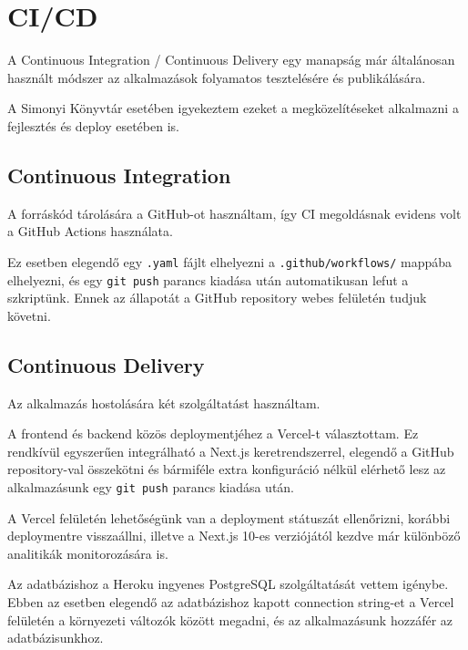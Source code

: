 \chapter{CI/CD}

A Continuous Integration / Continuous Delivery egy manapság már általánosan használt módszer az alkalmazások folyamatos tesztelésére és publikálására.

A Simonyi Könyvtár esetében igyekeztem ezeket a megközelítéseket alkalmazni a fejlesztés és deploy esetében is.

\section{Continuous Integration}

A forráskód tárolására a GitHub-ot használtam, így CI megoldásnak evidens volt a GitHub Actions használata.

Ez esetben elegendő egy \lstinline|.yaml| fájlt elhelyezni a \lstinline|.github/workflows/| mappába elhelyezni, és egy \lstinline|git push|
parancs kiadása után automatikusan lefut a szkriptünk. Ennek az állapotát a GitHub repository webes felületén tudjuk követni.

\section{Continuous Delivery}

Az alkalmazás hostolására két szolgáltatást használtam.

A frontend és backend közös deploymentjéhez a Vercel-t választottam. Ez rendkívül egyszerűen integrálható a Next.js keretrendszerrel,
elegendő a GitHub repository-val összekötni és bármiféle extra konfiguráció nélkül elérhető lesz az alkalmazásunk egy \lstinline|git push| parancs kiadása után.

A Vercel felületén lehetőségünk van a deployment státuszát ellenőrizni, korábbi deploymentre visszaállni, illetve a Next.js 10-es verziójától kezdve
már különböző analitikák monitorozására is.

Az adatbázishoz a Heroku ingyenes PostgreSQL szolgáltatását vettem igénybe. Ebben az esetben elegendő az adatbázishoz kapott
connection string-et a Vercel felületén a környezeti változók között megadni, és az alkalmazásunk hozzáfér az adatbázisunkhoz.
